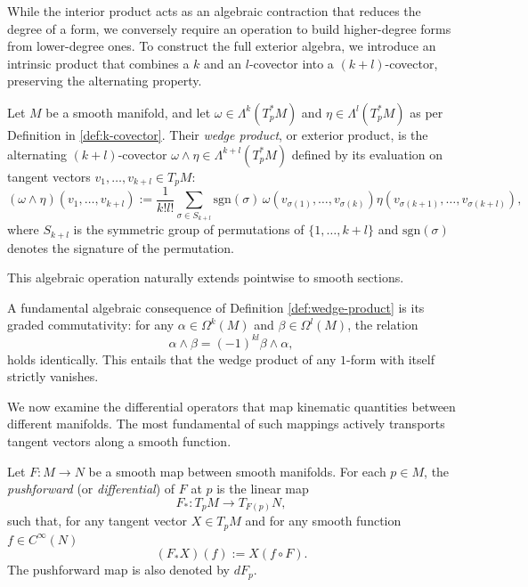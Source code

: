 While the interior product acts as an algebraic contraction that reduces the degree of a form, we conversely require an operation to build higher-degree forms from lower-degree ones. To construct the full exterior algebra, we introduce an intrinsic product that combines a $k$ and an $l$-covector into a $(k+l)$-covector, preserving the alternating property.

\begin{definition}\label{def:wedge-product}
	Let $M$ be a smooth manifold, and let $\omega \in \Lambda^k(T_p^*M)$ and $\eta \in \Lambda^l(T_p^*M)$ as per Definition in \ref{def:k-covector}. Their \emph{wedge product}, or exterior product, is the alternating $(k+l)$-covector $\omega \wedge \eta \in \Lambda^{k+l}(T_p^*M)$ defined by its evaluation on tangent vectors $v_1, \dots, v_{k+l} \in T_pM$:
	\[
	(\omega \wedge \eta)(v_1, \dots, v_{k+l}) := \frac{1}{k!l!} \sum_{\sigma \in S_{k+l}} \mathrm{sgn}(\sigma)\, \omega(v_{\sigma(1)}, \dots, v_{\sigma(k)}) \eta(v_{\sigma(k+1)}, \dots, v_{\sigma(k+l)}),
	\]
	where $S_{k+l}$ is the symmetric group of permutations of $\{1, \dots, k+l\}$ and $\mathrm{sgn}(\sigma)$ denotes the signature of the permutation. 
\end{definition}

\noindent This algebraic operation naturally extends pointwise to smooth sections.

\begin{remark}\label{rem:graded-commutativity}
	A fundamental algebraic consequence of Definition \ref{def:wedge-product} is its graded commutativity: for any $\alpha \in \Omega^k(M)$ and $\beta \in \Omega^l(M)$, the relation
	\[
	\alpha \wedge \beta = (-1)^{kl} \beta \wedge \alpha,
	\]
	holds identically. This entails that the wedge product of any $1$-form with itself strictly vanishes.
\end{remark}

We now examine the differential operators that map kinematic quantities between different manifolds. The most fundamental of such mappings actively transports tangent vectors along a smooth function.

\begin{definition}\label{def:pushforward}
	Let $F: M \to N$ be a smooth map between smooth manifolds. For each $p \in M$, the \textit{pushforward} (or \textit{differential}) of $F$ at $p$ is the linear map 
	\[
		F_*: T_pM \to T_{F(p)}N,
	\]
	such that, for any tangent vector $X \in T_pM$ and for any smooth function $f \in C^\infty(N)$
	\[
	(F_*X)(f) := X(f \circ F).
	\]
	The pushforward map is also denoted by $dF_p$.
\end{definition}

